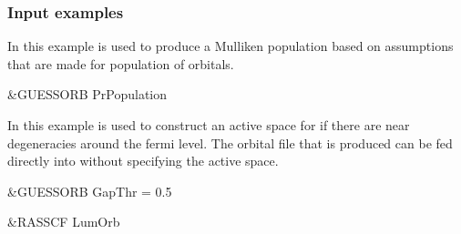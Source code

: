\subsubsection{Input examples}

In this example  is used to produce
a Mulliken population based on assumptions that are made for
population of orbitals.

\begin{inputlisting}
 &GUESSORB
PrPopulation
\end{inputlisting}

In this example  is used to construct
an active space for  if there are
near degeneracies around the fermi level.
The orbital file that is produced can be fed directly
into  without specifying the active space.

\begin{inputlisting}
 &GUESSORB
GapThr =  0.5

 &RASSCF
LumOrb
\end{inputlisting}
